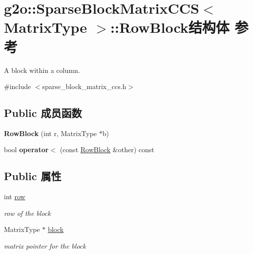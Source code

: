 \hypertarget{structg2o_1_1SparseBlockMatrixCCS_1_1RowBlock}{\section{g2o\-:\-:Sparse\-Block\-Matrix\-C\-C\-S$<$ Matrix\-Type $>$\-:\-:Row\-Block结构体 参考}
\label{structg2o_1_1SparseBlockMatrixCCS_1_1RowBlock}
}


A block within a column.  




{\ttfamily \#include $<$sparse\-\_\-block\-\_\-matrix\-\_\-ccs.\-h$>$}

\subsection*{Public 成员函数}
\begin{DoxyCompactItemize}
\item 
\hypertarget{structg2o_1_1SparseBlockMatrixCCS_1_1RowBlock_a78e2ec549fa14a225280b94022d05cea}{{\bfseries Row\-Block} (int r, Matrix\-Type $\ast$b)}\label{structg2o_1_1SparseBlockMatrixCCS_1_1RowBlock_a78e2ec549fa14a225280b94022d05cea}

\item 
\hypertarget{structg2o_1_1SparseBlockMatrixCCS_1_1RowBlock_a13e5fb6f5883f74e44bdd89c75ab9968}{bool {\bfseries operator$<$} (const \hyperlink{structg2o_1_1SparseBlockMatrixCCS_1_1RowBlock}{Row\-Block} \&other) const }\label{structg2o_1_1SparseBlockMatrixCCS_1_1RowBlock_a13e5fb6f5883f74e44bdd89c75ab9968}

\end{DoxyCompactItemize}
\subsection*{Public 属性}
\begin{DoxyCompactItemize}
\item 
\hypertarget{structg2o_1_1SparseBlockMatrixCCS_1_1RowBlock_af414f235d5aa28ca1508cfa0860c4949}{int \hyperlink{structg2o_1_1SparseBlockMatrixCCS_1_1RowBlock_af414f235d5aa28ca1508cfa0860c4949}{row}}\label{structg2o_1_1SparseBlockMatrixCCS_1_1RowBlock_af414f235d5aa28ca1508cfa0860c4949}

\begin{DoxyCompactList}\small\item\em row of the block \end{DoxyCompactList}\item 
\hypertarget{structg2o_1_1SparseBlockMatrixCCS_1_1RowBlock_a88ab75d0e29496d3ca023105256a2926}{Matrix\-Type $\ast$ \hyperlink{structg2o_1_1SparseBlockMatrixCCS_1_1RowBlock_a88ab75d0e29496d3ca023105256a2926}{block}}\label{structg2o_1_1SparseBlockMatrixCCS_1_1RowBlock_a88ab75d0e29496d3ca023105256a2926}

\begin{DoxyCompactList}\small\item\em matrix pointer for the block \end{DoxyCompactList}\end{DoxyCompactItemize}


